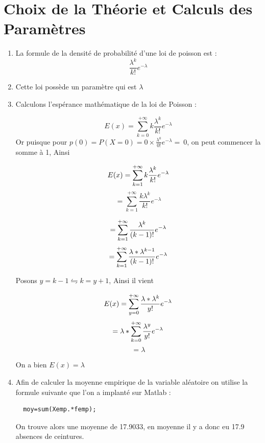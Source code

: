 \documentclass[a4paper,oneside]{article}
\begin{document}
\section{Choix de la Théorie et Calculs des Paramètres}

\begin{enumerate}
  \item

La formule de la densité de probabilité d'une loi de poisson est :
  \[
\frac{\lambda^k}{k!} e^{- \lambda}
  \]

  \item

  Cette loi possède un paramètre qui est $\lambda$

  \item Calculons l'espérance mathématique de la loi de Poisson :

\[
 E(x) = \sum_{k=0}^{+\infty} k\frac{\lambda^k}{k!} e^{-\lambda}
\]
Or puisque pour $p(0) =  P(X = 0)= 0 \times \frac{\lambda^0}{0!} e^{- \lambda} =\ 0$, on peut commencer la somme à 1, Ainsi 

\[
 E(x)=  \sum_{k=1}^{+\infty} k\frac{\lambda^k}{k!} e^{- \lambda}\\
 \]
 \[
  =  \sum_{k=1}^{+\infty} \frac{k \lambda^k}{k!} e^{-\lambda}
 \]
 
 \[
 =  \sum_{k=1}^{+\infty} \frac{ \lambda^k}{(k-1)!} e^{- \lambda}\\
 \]
 \[
  =  \sum_{k=1}^{+\infty} \frac{ \lambda*\lambda^{k-1}}{(k-1)!} e^{- \lambda}\\
\]

Posons $y=k-1 \leftrightharpoons k=y+1$, Ainsi il vient

\[
	  E(x) =  \sum_{y=0}^{+\infty} \frac{ \lambda*\lambda^{k}}{y!} e^{- \lambda}\\
\]
\[	  
	     =  \lambda*\sum_{k=0}^{+\infty} \frac{ \lambda^{y}}{y!} e^{- \lambda}\\
\]
\[	    
	     = \lambda
\]

On a bien $E(x) = \lambda$

  \item

Afin de calculer la moyenne empirique de la variable aléatoire on utilise la formule suivante que l'on a implanté sur Matlab :

\begin{lstlisting}
  moy=sum(Xemp.*femp);
\end{lstlisting}

On trouve alors une moyenne de 17.9033, en moyenne il y a donc eu 17.9 absences de ceintures.\\


\end{enumerate}
\end{document}
